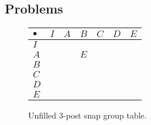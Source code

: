 \documentclass[../gatm.tex]{subfiles}
\begin{document}
\subsection{Problems}


\begin{figure}
\begin{center}
\begin{tabular}{C|C|C|C|C|C|C|}
$\bullet$ & $I$ & $A$ & $B$ & $C$ & $D$ & $E$ \\ \hline
$I$    &   &   &   &   &   &   \\ \hline
$A$    &   &   & $E$ &   &   &   \\ \hline
$B$    &   &   &   &   &   &   \\ \hline
$C$    &   &   &   &   &   &   \\ \hline
$D$    &   &   &   &   &   &   \\ \hline
$E$    &   &   &   &   &   &   \\ \hline
\end{tabular}
\end{center}
\caption{Unfilled $3$-post snap group table.}
\label{sbstable}
\end{figure}
\end{document}
